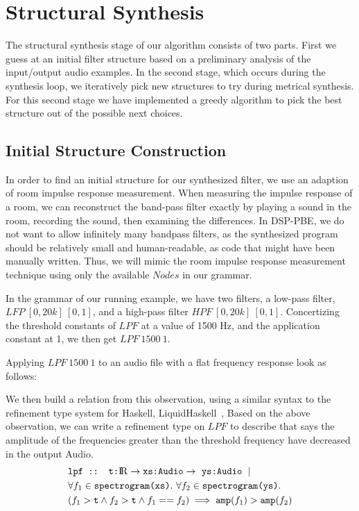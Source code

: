 \section{Structural Synthesis}
\label{sec:struct}

The structural synthesis stage of our algorithm consists of two parts.
First we guess at an initial filter structure based on a preliminary analysis of the input/output audio examples.
In the second stage, which occurs during the synthesis loop, we iteratively pick new structures to try during metrical synthesis.
For this second stage we have implemented a greedy algorithm to pick the best structure out of the possible next choices.

\subsection{Initial Structure Construction}
\label{sec:initStruct}
In order to find an initial structure for our synthesized filter, we use an adaption of room impulse response measurement.
When measuring the impulse response of a room, we can reconstruct the band-pass filter exactly by playing a sound in the room, recording the sound, then examining the differences.
In DSP-PBE, we do not want to allow infinitely many bandpass filters, as the synthesized program should be relatively small and human-readable, as code that might have been manually written.
Thus, we will mimic the room impulse response measurement technique using only the available $Nodes$ in our grammar.

In the grammar of our running example, we have two filters, a low-pass filter, $LFP \ [0,20k]\ [0,1]$, and a high-pass filter $HPF\ [0,20k]\ [0,1]$.
Concertizing the threshold constants of $LPF$ at a value of 1500 Hz, and the application constant at 1, we then get $LPF \ 1500 \ 1$.

Applying $LPF \ 1500 \ 1$ to an audio file with a flat frequency response look as follows:

We then build a relation from this observation, using a similar syntax to the refinement type system for Haskell, LiquidHaskell~\cite{vazou2014refinement}, 
Based on the above observation, we can write a refinement type on $LPF$ to describe that says the amplitude of the frequencies greater than the threshold frequency have decreased in the output Audio.
%
\begin{align*}
  &\texttt{lpf :: t:\reals} \to  \texttt{xs:Audio} \to\ \texttt{ys:Audio}\ \mid \\
  &\forall f_1 \in  \texttt{spectrogram(xs)}.\ \forall f_2 \in \texttt{spectrogram(ys)}. \\
  &(f_1 > \texttt{t}  \land  f_2 > \texttt{t}  \land f_1 == f_2) \implies \texttt{amp}(f_1) > \texttt{amp}(f_2)
\end{align*}

